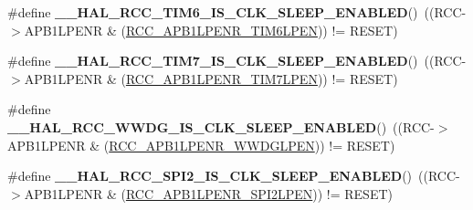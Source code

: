 \begin{DoxyCompactItemize}
\item 
\hypertarget{group___r_c_c___a_p_b1___clock___sleep___enable___disable___status_ga8d5d8a349946a4c0698d754ee107c3cf}{\#define {\bfseries \-\_\-\-\_\-\-H\-A\-L\-\_\-\-R\-C\-C\-\_\-\-T\-I\-M6\-\_\-\-I\-S\-\_\-\-C\-L\-K\-\_\-\-S\-L\-E\-E\-P\-\_\-\-E\-N\-A\-B\-L\-E\-D}()~((R\-C\-C-\/$>$A\-P\-B1\-L\-P\-E\-N\-R \& (\hyperlink{group___peripheral___registers___bits___definition_ga439a5998fd60c3375411c7db2129ac89}{R\-C\-C\-\_\-\-A\-P\-B1\-L\-P\-E\-N\-R\-\_\-\-T\-I\-M6\-L\-P\-E\-N})) != R\-E\-S\-E\-T)}\label{group___r_c_c___a_p_b1___clock___sleep___enable___disable___status_ga8d5d8a349946a4c0698d754ee107c3cf}

\item 
\hypertarget{group___r_c_c___a_p_b1___clock___sleep___enable___disable___status_gab1c825aefb8ae4ab199150ce061e7a8e}{\#define {\bfseries \-\_\-\-\_\-\-H\-A\-L\-\_\-\-R\-C\-C\-\_\-\-T\-I\-M7\-\_\-\-I\-S\-\_\-\-C\-L\-K\-\_\-\-S\-L\-E\-E\-P\-\_\-\-E\-N\-A\-B\-L\-E\-D}()~((R\-C\-C-\/$>$A\-P\-B1\-L\-P\-E\-N\-R \& (\hyperlink{group___peripheral___registers___bits___definition_gab7867dc2695855fa9084a13d06a4299f}{R\-C\-C\-\_\-\-A\-P\-B1\-L\-P\-E\-N\-R\-\_\-\-T\-I\-M7\-L\-P\-E\-N})) != R\-E\-S\-E\-T)}\label{group___r_c_c___a_p_b1___clock___sleep___enable___disable___status_gab1c825aefb8ae4ab199150ce061e7a8e}

\item 
\hypertarget{group___r_c_c___a_p_b1___clock___sleep___enable___disable___status_ga60b229aff9ca29a44a5470f52a48bb2f}{\#define {\bfseries \-\_\-\-\_\-\-H\-A\-L\-\_\-\-R\-C\-C\-\_\-\-W\-W\-D\-G\-\_\-\-I\-S\-\_\-\-C\-L\-K\-\_\-\-S\-L\-E\-E\-P\-\_\-\-E\-N\-A\-B\-L\-E\-D}()~((R\-C\-C-\/$>$A\-P\-B1\-L\-P\-E\-N\-R \& (\hyperlink{group___peripheral___registers___bits___definition_ga13f3db4ac67bf32c994364cc43f4fe8b}{R\-C\-C\-\_\-\-A\-P\-B1\-L\-P\-E\-N\-R\-\_\-\-W\-W\-D\-G\-L\-P\-E\-N})) != R\-E\-S\-E\-T)}\label{group___r_c_c___a_p_b1___clock___sleep___enable___disable___status_ga60b229aff9ca29a44a5470f52a48bb2f}

\item 
\hypertarget{group___r_c_c___a_p_b1___clock___sleep___enable___disable___status_gad6ee3d390b2b2748575725f5b0c42cfc}{\#define {\bfseries \-\_\-\-\_\-\-H\-A\-L\-\_\-\-R\-C\-C\-\_\-\-S\-P\-I2\-\_\-\-I\-S\-\_\-\-C\-L\-K\-\_\-\-S\-L\-E\-E\-P\-\_\-\-E\-N\-A\-B\-L\-E\-D}()~((R\-C\-C-\/$>$A\-P\-B1\-L\-P\-E\-N\-R \& (\hyperlink{group___peripheral___registers___bits___definition_ga41dcbf845448cbb1b75c0ad7e83b77cb}{R\-C\-C\-\_\-\-A\-P\-B1\-L\-P\-E\-N\-R\-\_\-\-S\-P\-I2\-L\-P\-E\-N})) != R\-E\-S\-E\-T)}\label{group___r_c_c___a_p_b1___clock___sleep___enable___disable___status_gad6ee3d390b2b2748575725f5b0c42cfc}


\end{DoxyCompactItemize}
